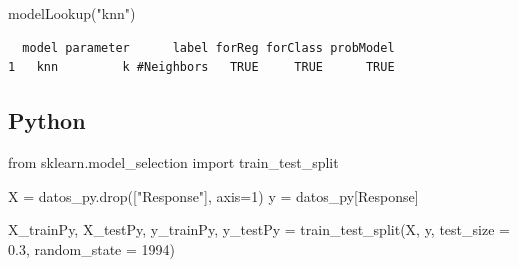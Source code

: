 \documentclass[
  letterpaper,
  DIV=11,
  numbers=noendperiod]{scrartcl}
\newenvironment{Shaded}{\begin{snugshade}}{\end{snugshade}}
\newcommand{\AttributeTok}[1]{\textcolor[rgb]{0.40,0.45,0.13}{#1}}
\newcommand{\ConstantTok}[1]{\textcolor[rgb]{0.56,0.35,0.01}{#1}}
\newcommand{\DecValTok}[1]{\textcolor[rgb]{0.68,0.00,0.00}{#1}}
\newcommand{\FloatTok}[1]{\textcolor[rgb]{0.68,0.00,0.00}{#1}}
\newcommand{\FunctionTok}[1]{\textcolor[rgb]{0.28,0.35,0.67}{#1}}
\newcommand{\ImportTok}[1]{\textcolor[rgb]{0.00,0.46,0.62}{#1}}
\newcommand{\NormalTok}[1]{\textcolor[rgb]{0.00,0.23,0.31}{#1}}
\newcommand{\OperatorTok}[1]{\textcolor[rgb]{0.37,0.37,0.37}{#1}}
\newcommand{\OtherTok}[1]{\textcolor[rgb]{0.00,0.23,0.31}{#1}}
\newcommand{\SpecialCharTok}[1]{\textcolor[rgb]{0.37,0.37,0.37}{#1}}
\newcommand{\StringTok}[1]{\textcolor[rgb]{0.13,0.47,0.30}{#1}}
\begin{document}
\begin{Shaded}
\end{Shaded}

\begin{Shaded}
\begin{Highlighting}[]
\FunctionTok{modelLookup}\NormalTok{(}\StringTok{"knn"}\NormalTok{)}
\end{Highlighting}
\end{Shaded}

\begin{verbatim}
  model parameter      label forReg forClass probModel
1   knn         k #Neighbors   TRUE     TRUE      TRUE
\end{verbatim}

\subsection{Python}

\begin{Shaded}
\begin{Highlighting}[]
\ImportTok{from}\NormalTok{ sklearn.model\_selection }\ImportTok{import}\NormalTok{ train\_test\_split}

\NormalTok{X }\OperatorTok{=}\NormalTok{ datos\_py.drop([}\StringTok{"Response"}\NormalTok{], axis}\OperatorTok{=}\DecValTok{1}\NormalTok{)}
\NormalTok{y }\OperatorTok{=}\NormalTok{ datos\_py[}\StringTok{\textquotesingle{}Response\textquotesingle{}}\NormalTok{]}

\NormalTok{X\_trainPy, X\_testPy, y\_trainPy, y\_testPy }\OperatorTok{=}\NormalTok{ train\_test\_split(X, y, test\_size }\OperatorTok{=} \FloatTok{0.3}\NormalTok{, random\_state }\OperatorTok{=} \DecValTok{1994}\NormalTok{)}
\end{Highlighting}
\end{Shaded}
\end{document}
